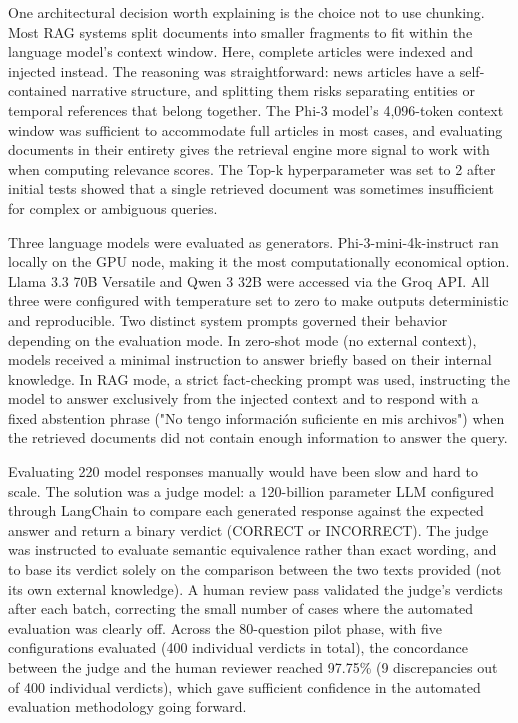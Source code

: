 One architectural decision worth explaining is the choice not to use chunking. Most RAG systems split documents into smaller fragments to fit within the language model's context window. Here, complete articles were indexed and injected instead. The reasoning was straightforward: news articles have a self-contained narrative structure, and splitting them risks separating entities or temporal references that belong together. The Phi-3 model's 4,096-token context window was sufficient to accommodate full articles in most cases, and evaluating documents in their entirety gives the retrieval engine more signal to work with when computing relevance scores. The Top-k hyperparameter was set to 2 after initial tests showed that a single retrieved document was sometimes insufficient for complex or ambiguous queries.

Three language models were evaluated as generators. Phi-3-mini-4k-instruct ran locally on the GPU node, making it the most computationally economical option. Llama 3.3 70B Versatile and Qwen 3 32B were accessed via the Groq API. All three were configured with temperature set to zero to make outputs deterministic and reproducible. Two distinct system prompts governed their behavior depending on the evaluation mode. In zero-shot mode (no external context), models received a minimal instruction to answer briefly based on their internal knowledge. In RAG mode, a strict fact-checking prompt was used, instructing the model to answer exclusively from the injected context and to respond with a fixed abstention phrase ("No tengo información suficiente en mis archivos") when the retrieved documents did not contain enough information to answer the query.

Evaluating 220 model responses manually would have been slow and hard to scale. The solution was a judge model: a 120-billion parameter LLM configured through LangChain to compare each generated response against the expected answer and return a binary verdict (CORRECT or INCORRECT). The judge was instructed to evaluate semantic equivalence rather than exact wording, and to base its verdict solely on the comparison between the two texts provided (not its own external knowledge). A human review pass validated the judge's verdicts after each batch, correcting the small number of cases where the automated evaluation was clearly off. Across the 80-question pilot phase, with five configurations evaluated (400 individual verdicts in total), the concordance between the judge and the human reviewer reached 97.75\% (9 discrepancies out of 400 individual verdicts), which gave sufficient confidence in the automated evaluation methodology going forward.

